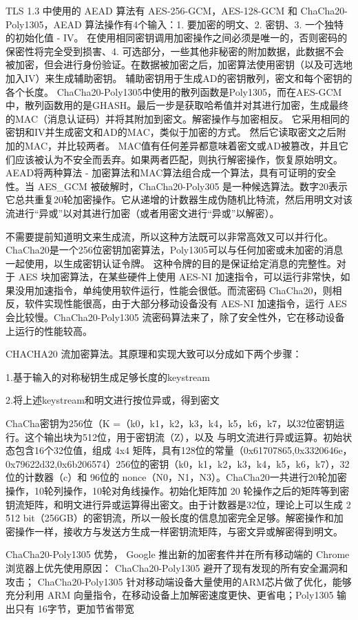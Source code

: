 
TLS 1.3 中使用的 AEAD 算法有 AES-256-GCM，AES-128-GCM 和 ChaCha20-Poly1305，AEAD 算法操作有4个输入：1. 要加密的明文、2. 密钥、3. 一个独特的初始化值 - IV。 在使用相同密钥调用加密操作之间必须是唯一的，否则密码的保密性将完全受到损害、4. 可选部分，一些其他非秘密的附加数据，此数据不会被加密，但会进行身份验证。在数据被加密之后，加密算法使用密钥（以及可选地加入IV）来生成辅助密钥。 辅助密钥用于生成AD的密钥散列，密文和每个密钥的各个长度。 ChaCha20-Poly1305中使用的散列函数是Poly1305，而在AES-GCM中，散列函数用的是GHASH。最后一步是获取哈希值并对其进行加密，生成最终的MAC（消息认证码）并将其附加到密文。解密操作与加密相反。 它采用相同的密钥和IV并生成密文和AD的MAC，类似于加密的方式。 然后它读取密文之后附加的MAC，并比较两者。 MAC值有任何差异都意味着密文或AD被篡改，并且它们应该被认为不安全而丢弃。如果两者匹配，则执行解密操作，恢复原始明文。AEAD将两种算法 - 加密算法和MAC算法组合成一个算法，具有可证明的安全性。当 AES\_GCM 被破解时，ChaCha20-Poly305 是一种候选算法。数字20表示它总共重复20轮加密操作。它从递增的计数器生成伪随机比特流，然后用明文对该流进行“异或”以对其进行加密（或者用密文进行“异或”以解密）。 

不需要提前知道明文来生成流，所以这种方法既可以非常高效又可以并行化。 ChaCha20是一个256位密钥加密算法，Poly1305可以与任何加密或未加密的消息一起使用，以生成密钥认证令牌。 这种令牌的目的是保证给定消息的完整性。对于 AES 块加密算法，在某些硬件上使用 AES-NI 加速指令，可以运行非常快，如果没用加速指令，单纯使用软件运行，性能会很低。而流密码 ChaCha20，则相反，软件实现性能很高，由于大部分移动设备没有 AES-NI 加速指令，运行 AES 会比较慢。ChaCha20-Poly1305 流密码算法来了，除了安全性外，它在移动设备上运行的性能较高。


CHACHA20 流加密算法。其原理和实现大致可以分成如下两个步骤：

1.基于输入的对称秘钥生成足够长度的keystream

2.将上述keystream和明文进行按位异或，得到密文

ChaCha密钥为256位（K =（k0，k1，k2，k3，k4，k5，k6，k7，以32位密钥运行。这个输出块为512位，用于密钥流（Z），以及 与明文流进行异或运算。初始状态包含16个32位值，组成 4x4 矩阵，具有128位的常量（0x61707865,0x3320646e，0x79622d32,0x6b206574）256位的密钥（k0，k1，k2，k3，k4，k5，k6，k7），32位的计数器（c）和 96位的 nonce（N0，N1，N3）。ChaCha20一共进行20轮加密操作，10轮列操作，10轮对角线操作。初始化矩阵加 20 轮操作之后的矩阵等到密钥流矩阵，和明文进行异或运算得出密文。由于计数器是32位，理论上可以生成 2 \^ 512 bit（256GB）的密钥流，所以一般长度的信息加密完全足够。解密操作和加密操作一样，接收方与发送方生成一样密钥流矩阵，与密文异或解密得到明文。

ChaCha20-Poly1305 优势\cite{7507408}，\cite{7927078}
Google 推出新的加密套件并在所有移动端的 Chrome 浏览器上优先使用原因：
ChaCha20-Poly1305 避开了现有发现的所有安全漏洞和攻击；
ChaCha20-Poly1305 针对移动端设备大量使用的ARM芯片做了优化，能够充分利用 ARM 向量指令，在移动设备上加解密速度更快、更省电；Poly1305 输出只有 16字节，更加节省带宽

\newpage